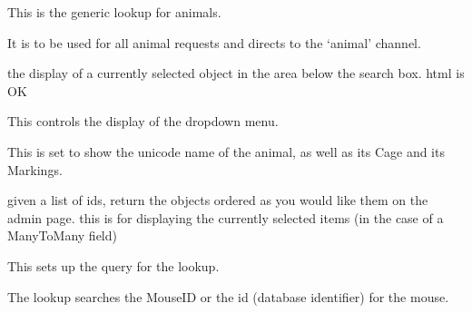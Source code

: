 \documentclass[letterpaper,10pt,english]{sphinxmanual}
\begin{document}
\begin{fulllineitems}
\label{animals:mousedb.animal.lookups.AnimalLookup}
This is the generic lookup for animals.

It is to be used for all animal requests and directs to the `animal' channel.

\begin{fulllineitems}
\label{animals:mousedb.animal.lookups.AnimalLookup.format_item}
the display of a currently selected object in the area below the search box. html is OK

\end{fulllineitems}


\begin{fulllineitems}
\label{animals:mousedb.animal.lookups.AnimalLookup.format_result}
This controls the display of the dropdown menu.

This is set to show the unicode name of the animal, as well as its Cage and its Markings.

\end{fulllineitems}


\begin{fulllineitems}
\label{animals:mousedb.animal.lookups.AnimalLookup.get_objects}
given a list of ids, return the objects ordered as you would like them on the admin page.
this is for displaying the currently selected items (in the case of a ManyToMany field)

\end{fulllineitems}


\begin{fulllineitems}
\label{animals:mousedb.animal.lookups.AnimalLookup.get_query}
This sets up the query for the lookup.

The lookup searches the MouseID or the id (database identifier) for the mouse.

\end{fulllineitems}


\end{fulllineitems}
\end{document}
